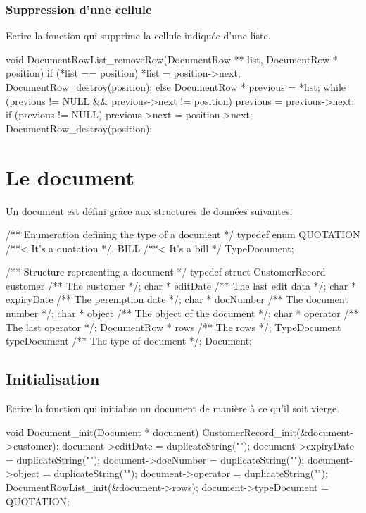 \subsubsection{Suppression d'une cellule}

Ecrire la fonction  qui supprime la cellule indiquée d'une liste.

\begin{csourcecorrection}
void DocumentRowList_removeRow(DocumentRow ** list, DocumentRow * position) {
    if (*list == position) {
        *list = position->next;
        DocumentRow_destroy(position);
    } else {
        DocumentRow * previous = *list;
        while (previous != NULL && previous->next != position)
            previous = previous->next;
        if (previous != NULL)
            previous->next = position->next;
        DocumentRow_destroy(position);
    }
}
\end{csourcecorrection}

\section{Le document}

Un document est défini grâce aux structures de données suivantes:
\begin{csource}
/** Enumeration defining the type of a document */
typedef enum {
    QUOTATION /**< It's a quotation */,
    BILL /**< It's a bill */
} TypeDocument;

/** Structure representing a document */
typedef struct {
    CustomerRecord customer /** The customer */;
    char * editDate /** The last edit data */;
    char * expiryDate /** The peremption date */;
    char * docNumber /** The document number */;
    char * object /** The object of the document */;
    char * operator /** The last operator */;
    DocumentRow * rows /** The rows */;
    TypeDocument typeDocument /** The type of document */;
} Document;
\end{csource}

\subsection{Initialisation}

Ecrire la fonction  qui initialise un document  de manière à ce qu'il soit vierge.

\begin{csourcecorrection}
void Document_init(Document * document) {
    CustomerRecord_init(&document->customer);
    document->editDate = duplicateString("");
    document->expiryDate = duplicateString("");
    document->docNumber = duplicateString("");
    document->object = duplicateString("");
    document->operator = duplicateString("");
    DocumentRowList_init(&document->rows);
    document->typeDocument = QUOTATION;
}
\end{csourcecorrection}

